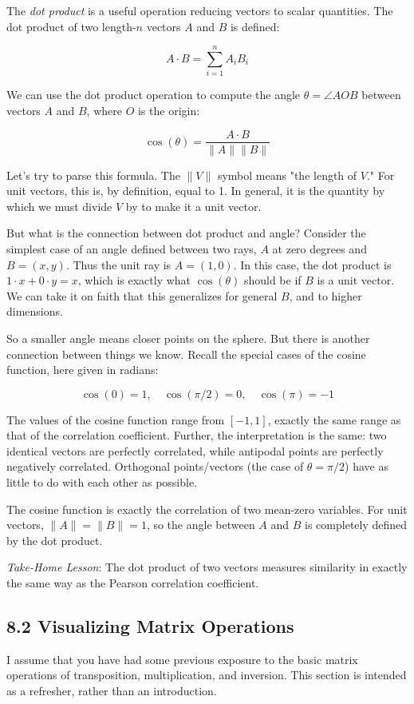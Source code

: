 \documentclass[10pt]{article}
\begin{document}
The \textit{dot product} is a useful operation reducing vectors to scalar quantities. The dot product of two length-$n$ vectors $A$ and $B$ is defined:

\[ A \cdot B = \sum_{i=1}^n A_i B_i \]

We can use the dot product operation to compute the angle $\theta = \angle A O B$ between vectors $A$ and $B$, where $O$ is the origin:

\[ \cos(\theta) = \frac{A \cdot B}{\|A\|\|B\|} \]

Let's try to parse this formula. The $\|V\|$ symbol means "the length of $V$." For unit vectors, this is, by definition, equal to 1. In general, it is the quantity by which we must divide $V$ by to make it a unit vector.

But what is the connection between dot product and angle? Consider the simplest case of an angle defined between two rays, $A$ at zero degrees and $B=(x, y)$. Thus the unit ray is $A=(1,0)$. In this case, the dot product is $1 \cdot x + 0 \cdot y = x$, which is exactly what $\cos(\theta)$ should be if $B$ is a unit vector. We can take it on faith that this generalizes for general $B$, and to higher dimensions.

So a smaller angle means closer points on the sphere. But there is another connection between things we know. Recall the special cases of the cosine function, here given in radians:

\[ \cos(0) = 1, \quad \cos(\pi/2) = 0, \quad \cos(\pi) = -1 \]

The values of the cosine function range from $[-1,1]$, exactly the same range as that of the correlation coefficient. Further, the interpretation is the same: two identical vectors are perfectly correlated, while antipodal points are perfectly negatively correlated. Orthogonal points/vectors (the case of $\theta = \pi/2$) have as little to do with each other as possible.

The cosine function is exactly the correlation of two mean-zero variables. For unit vectors, $\|A\| = \|B\| = 1$, so the angle between $A$ and $B$ is completely defined by the dot product.

\textit{Take-Home Lesson}: The dot product of two vectors measures similarity in exactly the same way as the Pearson correlation coefficient.

\subsection*{8.2 Visualizing Matrix Operations}
I assume that you have had some previous exposure to the basic matrix operations of transposition, multiplication, and inversion. This section is intended as a refresher, rather than an introduction.
\end{document}
